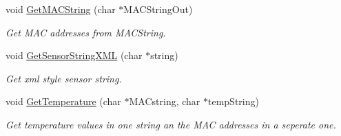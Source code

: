 \begin{DoxyCompactItemize}
void \hyperlink{classSensors_1_1DS18B20_a78f6bbedbe849612f39ef6600a7b91f3}{Get\+M\+A\+C\+String} (char $\ast$M\+A\+C\+String\+Out)
\begin{DoxyCompactList}\small\item\em Get M\+AC addresses from M\+A\+C\+String. \end{DoxyCompactList}\item 
void \hyperlink{classSensors_1_1DS18B20_aeed18c0c1d714f084dab8a74437a3c35}{Get\+Sensor\+String\+X\+ML} (char $\ast$string)
\begin{DoxyCompactList}\small\item\em Get xml style sensor string. \end{DoxyCompactList}\item 
void \hyperlink{classSensors_1_1DS18B20_a788dc2898e3ad1a0a17d042cf5e3dd9a}{Get\+Temperature} (char $\ast$M\+A\+Cstring, char $\ast$temp\+String)
\begin{DoxyCompactList}\small\item\em Get temperature values in one string an the M\+AC addresses in a seperate one. \end{DoxyCompactList}\end{DoxyCompactItemize}
